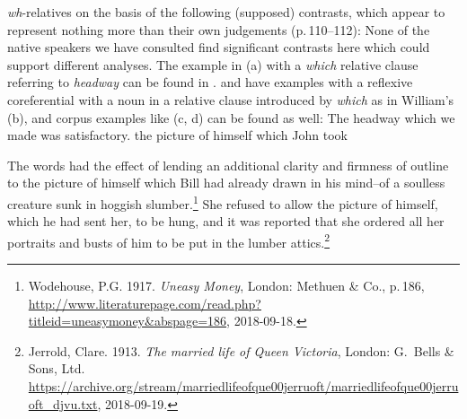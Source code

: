 \documentclass[output=paper
                ,modfonts
                ,nonflat
	        ,collection
	        ,collectionchapter
	        ,collectiontoclongg
 	        ,biblatex
                ,babelshorthands
                ,newtxmath
                ,draftmode
                ,colorlinks, citecolor=brown
]{./langsci/langscibook}
\begin{document}
\emph{wh}-relatives on the basis of the following (supposed) contrasts, which appear to represent
nothing more than their own judgements (p.\,110--112):
\eal
{}
\label{ex:min-headway-that}
\label{ex:min-headway-which}
\zl
\eal
{}
\label{ex:min-admire-that}
\label{ex:min-admire-which} 
\zl
\eal
{}
\label{ex:min-picture-that}
\label{ex:min-picture-which} 
\zl
None of the native speakers we have consulted find significant contrasts here which could support
different analyses. The example in (a) with a \emph{which} relative clause referring to \emph{headway} can be found in
.  and  have examples
with a reflexive coreferential with a noun in a relative clause introduced by \emph{which} as in
William's (b), and corpus examples like (c, d) can be found as well:
\ealnoraggedright
\ex The headway which we made was satisfactory.
\ex the picture of himself which John took

\ex The words had the effect of lending an additional clarity and firmness of outline to the picture
    of himself which Bill had already drawn in his mind--of a soulless creature sunk in hoggish
    slumber.\footnote{
      Wodehouse, P.G. 1917. \emph{Uneasy Money}, London: Methuen \& Co., p.\,186,
      \url{http://www.literaturepage.com/read.php?titleid=uneasymoney&abspage=186},
      2018-09-18.
}
\ex She refused to allow the 
picture of himself, which he had sent her, to be hung, 
and it was reported that she ordered all her portraits 
and busts of him to be put in the lumber attics.\footnote{
 Jerrold, Clare. 1913. \emph{The married life of Queen Victoria}, London: G.\ Bells \& Sons, Ltd.
 \url{https://archive.org/stream/marriedlifeofque00jerruoft/marriedlifeofque00jerruoft_djvu.txt}, 2018-09-19.
}
\end{document}
